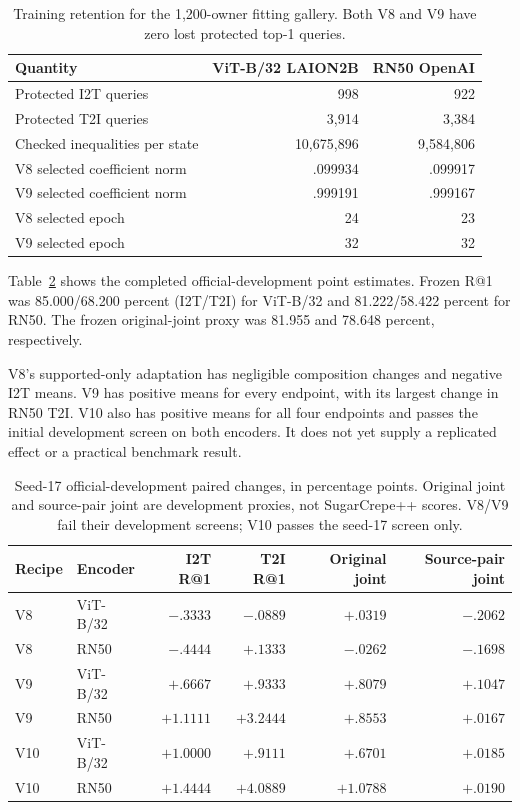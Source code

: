 \documentclass[11pt]{article}
\begin{document}
\begin{table}[t]
\centering
\caption{Training retention for the 1,200-owner fitting gallery.
Both V8 and V9 have zero lost protected top-1 queries.}\label{tab:certificate}
\begin{tabular}{lrr}
\toprule
Quantity & ViT-B/32 LAION2B & RN50 OpenAI\\
\midrule
Protected I2T queries & 998 & 922\\
Protected T2I queries & 3,914 & 3,384\\
Checked inequalities per state & 10,675,896 & 9,584,806\\
V8 selected coefficient norm & .099934 & .099917\\
V9 selected coefficient norm & .999191 & .999167\\
V8 selected epoch & 24 & 23\\
V9 selected epoch & 32 & 32\\
\bottomrule
\end{tabular}
\end{table}

\begin{samepage}
Table~\ref{tab:means} shows the completed official-development point
estimates. Frozen R@1 was 85.000/68.200 percent (I2T/T2I) for ViT-B/32 and
81.222/58.422 percent for RN50. The frozen original-joint proxy was
81.955 and 78.648 percent, respectively.\par
\end{samepage}

V8's supported-only adaptation
has negligible composition changes and negative I2T means. V9 has positive
means for every endpoint, with its largest change in RN50 T2I.
V10 also has positive means for all four endpoints and passes the initial
development screen on both encoders. It does not yet supply a replicated
effect or a practical benchmark result.

\begin{table}[t]
\centering\small
\caption{Seed-17 official-development paired changes, in percentage
points. Original joint and source-pair joint are development proxies,
not SugarCrepe++ scores. V8/V9 fail their development screens; V10 passes
the seed-17 screen only.}
\label{tab:means}
\begin{tabular}{llrrrr}
\toprule
Recipe & Encoder & I2T R@1 & T2I R@1 & Original joint & Source-pair joint\\
\midrule
V8 & ViT-B/32 & $-.3333$ & $-.0889$ & $+.0319$ & $-.2062$\\
V8 & RN50 & $-.4444$ & $+.1333$ & $-.0262$ & $-.1698$\\
V9 & ViT-B/32 & $+.6667$ & $+.9333$ & $+.8079$ & $+.1047$\\
V9 & RN50 & $+1.1111$ & $+3.2444$ & $+.8553$ & $+.0167$\\
V10 & ViT-B/32 & $+1.0000$ & $+.9111$ & $+.6701$ & $+.0185$\\
V10 & RN50 & $+1.4444$ & $+4.0889$ & $+1.0788$ & $+.0190$\\
\bottomrule
\end{tabular}
\end{table}
\end{document}
